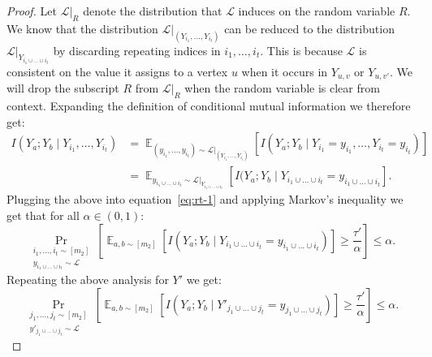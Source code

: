 \documentclass[11pt]{article}
\DeclareMathOperator*{\E}{\mathbb{E}}
\def \cL {\mathcal{L}}
\theoremstyle{definition}
\begin{document}
\begin{proof}
Let $\cL|_R$ denote the distribution that $\cL$ induces on the random variable $R$. We know that the distribution $\cL|_{(Y_{i_1}, \ldots, Y_{i_t})}$ can be reduced to the distribution $\cL|_{Y_{i_1 \cup \ldots \cup i_t}}$ by discarding repeating indices in $i_1,\ldots,i_t$. This is because $\cL$ is consistent on the value it assigns to a vertex $u$ when it occurs in $Y_{u,v}$ or $Y_{u,v'}$. We will drop the subscript $R$ from $\cL|_R$ when the random variable is clear from context. Expanding the definition of conditional mutual information we therefore get:
\begin{align*}
I(Y_a;Y_b \mid Y_{i_1}, \ldots, Y_{i_t}) &= \E_{(y_{i_1}, \ldots,y_{i_t}) \sim \cL|_{(Y_{i_1}, \ldots, Y_{i_t})}}[I(Y_a ; Y_b \mid Y_{i_1} = y_{i_1}, \ldots,Y_{i_t} = y_{i_t})] \\
&= \E_{y_{i_1 \cup \ldots \cup i_t} \sim \cL|_{Y_{i_1 \cup \ldots \cup i_t}}}[I(Y_a ; Y_b \mid Y_{i_1 \cup \ldots \cup i_t} = y_{i_1 \cup \ldots \cup i_t}].
\end{align*}
Plugging the above into equation~\eqref{eq:rt-1} and applying Markov's inequality we get that for all $\alpha \in (0,1)$:
\begin{equation}\label{eq:avg1}
\Pr_{\substack{i_1,\ldots,i_t \sim [m_2] \\ y_{i_1 \cup \ldots \cup i_t} \sim \cL}}\left[\E_{a,b \sim [m_2]}[I(Y_a ; Y_b \mid Y_{i_1 \cup \ldots \cup i_t} = y_{i_1 \cup \ldots \cup i_t})] \geq \frac{\tau'}{\alpha} \right] \leq \alpha.
\end{equation}
Repeating the above analysis for $Y'$ we get:
\begin{equation}\label{eq:avg2}
\Pr_{\substack{j_1,\ldots,j_t \sim [m_2] \\ y'_{j_1 \cup \ldots \cup j_t} \sim \cL}}\left[\E_{a,b \sim [m_2]}[I(Y_a ; Y_b \mid Y'_{j_1 \cup \ldots \cup j_t} = y_{j_1 \cup \ldots \cup j_t})] \geq \frac{\tau'}{\alpha} \right] \leq \alpha.
\end{equation}


\end{proof}
\end{document}
